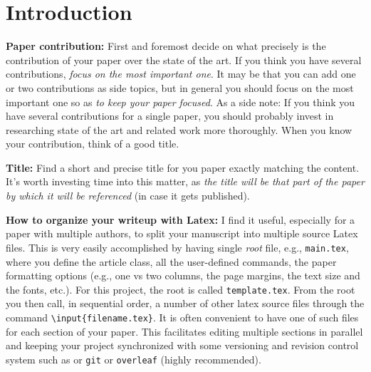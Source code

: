
\section{Introduction}
\label{sec:introduction}

\begin{remark}
\textbf{Paper contribution:} First and foremost decide on what precisely is the contribution of your paper over the state of the art. If you think you have several contributions, {\it focus on the most important one}. It may be that you can add one or two contributions as side topics, but in general you should focus on the most important one so as {\it to keep your paper focused}. As a side note: If you think you have several contributions for a single paper, you should probably invest in researching state of the art and related work more thoroughly. When you know your contribution, think of a good title.
\end{remark}

\begin{remark} 
\textbf{Title:} Find a short and precise title for you paper exactly matching the content. It's worth investing time into this matter, as {\it the title will be that part of the paper by which it will be referenced} (in case it gets published).
\end{remark}

\begin{remark}
\textbf{How to organize your writeup with Latex:} I find it useful, especially for a paper with multiple authors, to split your manuscript into multiple source Latex files. This is very easily accomplished by having single {\it root} file, e.g., \texttt{main.tex}, where you define the article class, all the \mbox{user-defined} commands, the paper formatting options (e.g., one vs two columns, the page margins, the text size and the fonts, etc.). For this project, the root is called \texttt{template.tex}. From the root you then call, in sequential order, a number of other latex source files through the command \texttt{\textbackslash input\{filename.tex\}}. It is often convenient to have one of such files for each section of your paper. This facilitates editing multiple sections in parallel and keeping your project synchronized with some versioning and revision control system such as  or \texttt{git} or \texttt{overleaf} (highly recommended).
\end{remark}

